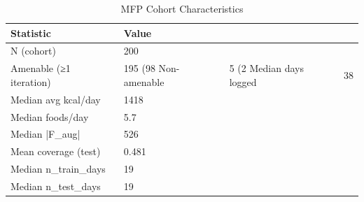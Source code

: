\begin{table}
\caption{MFP Cohort Characteristics}
\label{tab:mfp_cohort}
\begin{tabular}{ll}
\toprule
Statistic & Value \\
\midrule
N (cohort) & 200 \\
Amenable (≥1 iteration) & 195 (98%
Non-amenable & 5 (2%
Median days logged & 38 \\
Median avg kcal/day & 1418 \\
Median foods/day & 5.7 \\
Median |F_aug| & 526 \\
Mean coverage (test) & 0.481 \\
Median n_train_days & 19 \\
Median n_test_days & 19 \\
\bottomrule
\end{tabular}
\end{table}
